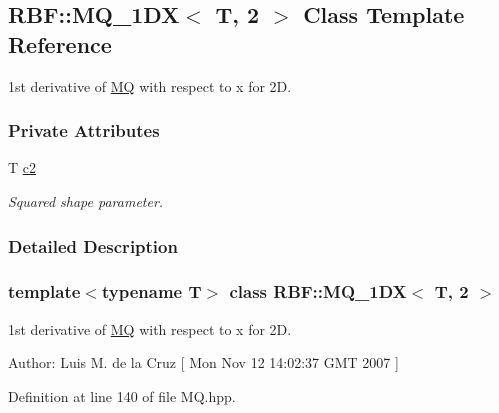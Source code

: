 \hypertarget{classRBF_1_1MQ__1DX_3_01T_00_012_01_4}{
\subsection{RBF::MQ\_\-1DX$<$ T, 2 $>$ Class Template Reference}
\label{classRBF_1_1MQ__1DX_3_01T_00_012_01_4}
}
1st derivative of \hyperlink{classRBF_1_1MQ}{MQ} with respect to x for 2D.  


\subsubsection*{Private Attributes}
\begin{CompactItemize}
\item 
\hypertarget{classRBF_1_1MQ__1DX_3_01T_00_012_01_4_b9820bfca65f7dbd2553ef3136c1b157}{
T \hyperlink{classRBF_1_1MQ__1DX_3_01T_00_012_01_4_b9820bfca65f7dbd2553ef3136c1b157}{c2}}
\label{classRBF_1_1MQ__1DX_3_01T_00_012_01_4_b9820bfca65f7dbd2553ef3136c1b157}

\begin{CompactList}\small\item\em Squared shape parameter. \item\end{CompactList}\end{CompactItemize}


\subsubsection{Detailed Description}
\subsubsection*{template$<$typename T$>$ class RBF::MQ\_\-1DX$<$ T, 2 $>$}

1st derivative of \hyperlink{classRBF_1_1MQ}{MQ} with respect to x for 2D. 

\begin{Desc}
\item[Author:]Luis M. de la Cruz \mbox{[} Mon Nov 12 14:02:37 GMT 2007 \mbox{]} \end{Desc}


Definition at line 140 of file MQ.hpp.